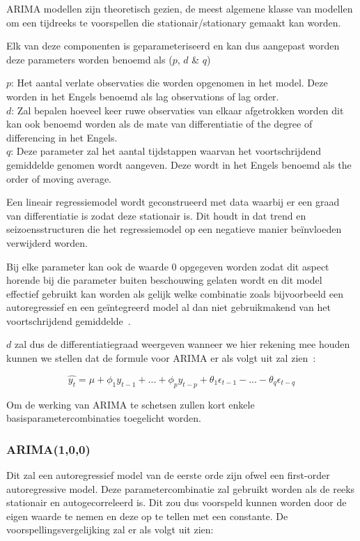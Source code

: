 ARIMA modellen zijn theoretisch gezien, de meest algemene klasse van modellen om een tijdreeks te voorspellen die stationair/stationary gemaakt kan worden. 

Elk van deze componenten is geparameteriseerd en kan dus aangepast worden deze parameters worden benoemd als ($p$, $d$ \& $q$)

$p$: Het aantal verlate observaties die worden opgenomen in het model. Deze worden in het Engels benoemd als lag observations of lag order.
\\$d$: Zal bepalen hoeveel keer ruwe observaties van elkaar afgetrokken worden dit kan ook benoemd worden als de mate van differentiatie of the degree of differencing in het Engels.
\\$q$: Deze parameter zal het aantal tijdstappen waarvan het voortschrijdend gemiddelde genomen wordt aangeven. Deze wordt in het Engels benoemd als the order of moving average. 

Een lineair regressiemodel wordt geconstrueerd met data waarbij er een graad van differentiatie is zodat deze stationair is. Dit houdt in dat trend en seizoensstructuren die het regressiemodel op een negatieve manier be\"{i}nvloeden verwijderd worden.

Bij elke parameter kan ook de waarde 0 opgegeven worden zodat dit aspect horende bij die parameter buiten beschouwing gelaten wordt en dit model effectief gebruikt kan worden als gelijk welke combinatie zoals bijvoorbeeld een autoregressief en een ge\"{i}ntegreerd model al dan niet gebruikmakend van het voortschrijdend gemiddelde~\autocite{Brownlee2018}.

$d$ zal dus de differentiatiegraad weergeven wanneer we hier rekening mee houden kunnen we stellen dat de formule voor ARIMA er als volgt uit zal zien~\autocite{Nau2020}:

\begin{equation}
\hat{y_t} = \mu + \phi_1 y_{t-1} + ... + \phi_p y_{t-p} + \theta_1 \epsilon_{t-1} - ... - \theta_q \epsilon_{t-q}
\end{equation}

Om de werking van ARIMA te schetsen zullen kort enkele basisparametercombinaties toegelicht worden.

\subsubsection{ARIMA(1,0,0)}

Dit zal een autoregressief model van de eerste orde zijn ofwel een first-order autoregressive model. Deze parametercombinatie zal gebruikt worden als de reeks stationair en autogecorreleerd is. Dit zou dus voorspeld kunnen worden door de eigen waarde te nemen en deze op te tellen met een constante. De voorspellingsvergelijking zal er als volgt uit zien:

